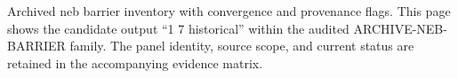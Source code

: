 Archived neb barrier inventory with convergence and provenance flags. This page shows the candidate output ``1 7 historical'' within the audited ARCHIVE-NEB-BARRIER family. The panel identity, source scope, and current status are retained in the accompanying evidence matrix.
